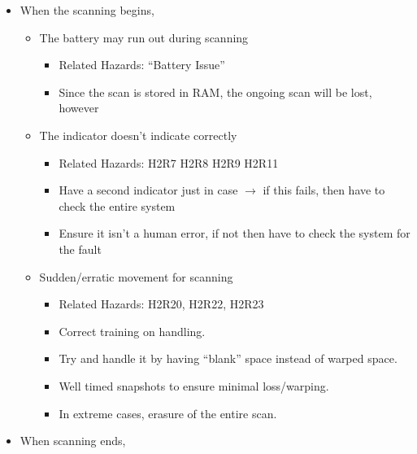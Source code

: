 \documentclass[11pt]{article}
\begin{document}
\begin{itemize}
\begin{itemize}
\begin{itemize}
				\end{itemize}
			\item The battery may suddenly run out 
				\begin{itemize}
					\item Related Hazards: “Battery Issue” 
					\item If this happens, ensure proper shutdown protocol so even if it suddenly loses power, it wouldn’t have devastating consequences 
				\end{itemize}
			\end{itemize}
			\item When the scanning begins, 
			\begin{itemize}
				\item The battery may run out during scanning 
				\begin{itemize}
					\item Related Hazards: “Battery Issue” 
					\item Since the scan is stored in RAM, the ongoing scan will be lost, however  
				\end{itemize}
				\item The indicator doesn’t indicate correctly 
					\begin{itemize}
						\item Related Hazards: H2R7 H2R8 H2R9 H2R11 
						\item Have a second indicator just in case $\rightarrow$ if this fails, then have to check the entire system 
						\item Ensure it isn't a human error, if not then have to check the system for the fault
					\end{itemize}
				\item Sudden/erratic movement for scanning 
					\begin{itemize}
						\item Related Hazards: H2R20, H2R22, H2R23 
						\item Correct training on handling. 
						\item Try and handle it by having “blank” space instead of warped space. 
						\item Well timed snapshots to ensure minimal loss/warping.
						\item In extreme cases, erasure of the entire scan. 
					\end{itemize}
			\end{itemize}
			\item When scanning ends, 
			\begin{itemize}

\end{itemize}
\end{itemize}
\end{document}
